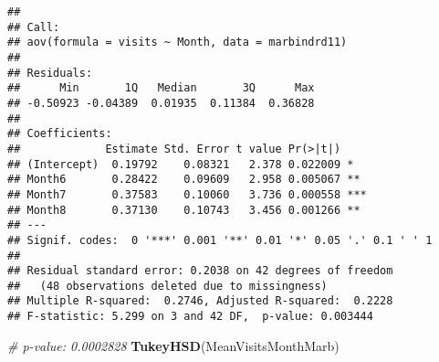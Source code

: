 \documentclass[]{article}
\newenvironment{Shaded}{\begin{snugshade}}{\end{snugshade}}
\newcommand{\CommentTok}[1]{\textcolor[rgb]{0.56,0.35,0.01}{\textit{#1}}}
\newcommand{\DataTypeTok}[1]{\textcolor[rgb]{0.13,0.29,0.53}{#1}}
\newcommand{\KeywordTok}[1]{\textcolor[rgb]{0.13,0.29,0.53}{\textbf{#1}}}
\newcommand{\NormalTok}[1]{#1}
\newcommand{\OperatorTok}[1]{\textcolor[rgb]{0.81,0.36,0.00}{\textbf{#1}}}
\newcommand{\StringTok}[1]{\textcolor[rgb]{0.31,0.60,0.02}{#1}}
\begin{document}
\begin{Shaded}
\end{Shaded}

\begin{verbatim}
## 
## Call:
## aov(formula = visits ~ Month, data = marbindrd11)
## 
## Residuals:
##      Min       1Q   Median       3Q      Max 
## -0.50923 -0.04389  0.01935  0.11384  0.36828 
## 
## Coefficients:
##             Estimate Std. Error t value Pr(>|t|)    
## (Intercept)  0.19792    0.08321   2.378 0.022009 *  
## Month6       0.28422    0.09609   2.958 0.005067 ** 
## Month7       0.37583    0.10060   3.736 0.000558 ***
## Month8       0.37130    0.10743   3.456 0.001266 ** 
## ---
## Signif. codes:  0 '***' 0.001 '**' 0.01 '*' 0.05 '.' 0.1 ' ' 1
## 
## Residual standard error: 0.2038 on 42 degrees of freedom
##   (48 observations deleted due to missingness)
## Multiple R-squared:  0.2746, Adjusted R-squared:  0.2228 
## F-statistic: 5.299 on 3 and 42 DF,  p-value: 0.003444
\end{verbatim}

\begin{Shaded}
\begin{Highlighting}[]
\CommentTok{# p-value: 0.0002828}
\KeywordTok{TukeyHSD}\NormalTok{(MeanVisitsMonthMarb)}
\end{Highlighting}
\end{Shaded}
\end{document}
